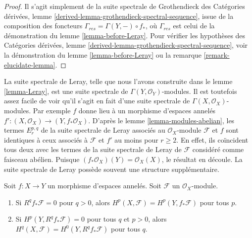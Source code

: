\begin{proof}
Il s'agit simplement de la suite spectrale de Grothendieck des Catégories dérivées, lemme \ref{derived-lemma-grothendieck-spectral-sequence}, issue de la composition des foncteurs $\Gamma_{res} = \Gamma(Y, -) \circ f_*$, où $\Gamma_{res}$ est celui de la démonstration du lemme \ref{lemma-before-Leray}. Pour vérifier les hypothèses des Catégories dérivées, lemme \ref{derived-lemma-grothendieck-spectral-sequence}, voir la démonstration du lemme \ref{lemma-before-Leray} ou la remarque \ref{remark-elucidate-lemma}.
\end{proof}

\begin{remark}

\label{remark-Leray-ss-more-structure}

La suite spectrale de Leray, telle que nous l'avons construite dans le lemme \ref{lemma-Leray},
est une suite spectrale de $\Gamma(Y, \mathcal{O}_Y)$-modules. Il est toutefois assez facile de voir qu'il s'agit en fait d'une suite spectrale de
$\Gamma(X, \mathcal{O}_X)$-modules. Par exemple $f$ donne lieu à un morphisme d'espaces annelés
$f' :  (X, \mathcal{O}_X) \to (Y, f_*\mathcal{O}_X)$. D'après le lemme \ref{lemma-modules-abelian}, les termes $E_r^{p, q}$ de la suite spectrale de Leray associés au $\mathcal{O}_X$-module $\mathcal{F}$
et $f$ sont identiques à ceux associés à $\mathcal{F}$ et $f'$
au moins pour $r \geq 2$. En effet, ils coïncident tous deux avec les termes de la suite spectrale de Leray de $\mathcal{F}$ considéré comme faisceau abélien. Puisque $(f_*\mathcal{O}_X)(Y) = \mathcal{O}_X(X)$, le résultat en découle. La suite spectrale de Leray possède souvent une structure supplémentaire.

\end{remark}

\begin{lemma}

\label{lemma-apply-Leray}
Soit $f : X \to Y$ un morphisme d'espaces annelés. Soit $\mathcal{F}$ un $\mathcal{O}_X$-module.
\begin{enumerate}
\item Si $R^qf_*\mathcal{F} = 0$ pour $q > 0$, alors $H^p(X, \mathcal{F}) = H^p(Y, f_*\mathcal{F})$ pour tous $p$.
\item Si $H^p(Y, R^qf_*\mathcal{F}) = 0$ pour tous $q$ et $p > 0$, alors $H^q(X, \mathcal{F}) = H^0(Y, R^qf_*\mathcal{F})$ pour tous $q$.
\end{enumerate}

\end{lemma}

